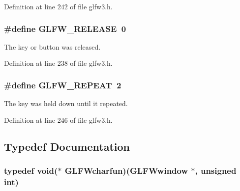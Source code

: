 Definition at line 242 of file glfw3.\-h.

\hypertarget{group__input_gada11d965c4da13090ad336e030e4d11f}{
\subsubsection[{G\-L\-F\-W\-\_\-\-R\-E\-L\-E\-A\-S\-E}]{\setlength{\rightskip}{0pt plus 5cm}\#define G\-L\-F\-W\-\_\-\-R\-E\-L\-E\-A\-S\-E~0}}\label{group__input_gada11d965c4da13090ad336e030e4d11f}


The key or button was released. 



Definition at line 238 of file glfw3.\-h.

\hypertarget{group__input_gac96fd3b9fc66c6f0eebaf6532595338f}{
\subsubsection[{G\-L\-F\-W\-\_\-\-R\-E\-P\-E\-A\-T}]{\setlength{\rightskip}{0pt plus 5cm}\#define G\-L\-F\-W\-\_\-\-R\-E\-P\-E\-A\-T~2}}\label{group__input_gac96fd3b9fc66c6f0eebaf6532595338f}


The key was held down until it repeated. 



Definition at line 246 of file glfw3.\-h.



\subsection{Typedef Documentation}
\hypertarget{group__input_ga1103f1876518acecb5976f6b307c51d1}{
\subsubsection[{G\-L\-F\-Wcharfun}]{\setlength{\rightskip}{0pt plus 5cm}typedef {\bf void}($\ast$  G\-L\-F\-Wcharfun)({\bf G\-L\-F\-Wwindow} $\ast$, unsigned {\bf int})}}\label{group__input_ga1103f1876518acecb5976f6b307c51d1}


